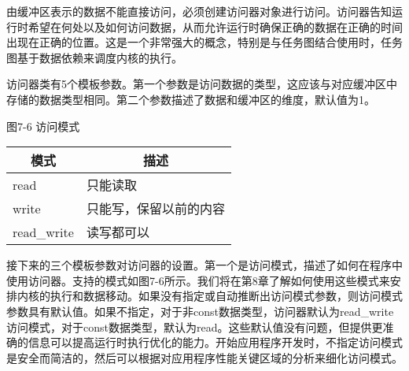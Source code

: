 由缓冲区表示的数据不能直接访问，必须创建访问器对象进行访问。访问器告知运行时希望在何处以及如何访问数据，从而允许运行时确保正确的数据在正确的时间出现在正确的位置。这是一个非常强大的概念，特别是与任务图结合使用时，任务图基于数据依赖来调度内核的执行。\par

访问器类有5个模板参数。第一个参数是访问数据的类型，这应该与对应缓冲区中存储的数据类型相同。第二个参数描述了数据和缓冲区的维度，默认值为1。\par

\hspace*{\fill} \par %
图7-6 访问模式
\begin{table}[H]
	\begin{tabular}{|l|l|}
		\hline
		\multicolumn{1}{|c|}{模式} & \multicolumn{1}{c|}{描述}               \\ \hline
		read                       & 只能读取                               \\ \hline
		write                      & 只能写，保留以前的内容 \\ \hline
		read\_write                & 读写都可以                          \\ \hline
	\end{tabular}
\end{table}

接下来的三个模板参数对访问器的设置。第一个是访问模式，描述了如何在程序中使用访问器。支持的模式如图7-6所示。我们将在第8章了解如何使用这些模式来安排内核的执行和数据移动。如果没有指定或自动推断出访问模式参数，则访问模式参数具有默认值。如果不指定，对于非const数据类型，访问器默认为read\_write访问模式，对于const数据类型，默认为read。这些默认值没有问题，但提供更准确的信息可以提高运行时执行优化的能力。开始应用程序开发时，不指定访问模式是安全而简洁的，然后可以根据对应用程序性能关键区域的分析来细化访问模式。\par

